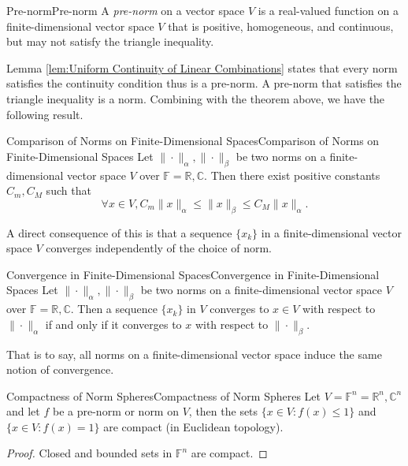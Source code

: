 \documentclass[../main.tex]{subfiles}
\begin{document}
\begin{definition}{Pre-norm}{Pre-norm}
  A \textit{pre-norm} on a vector space $V$ is a real-valued function on a finite-dimensional vector space $V$ that is positive, homogeneous, and continuous, but may not satisfy the triangle inequality.
\end{definition}

Lemma \ref{lem:Uniform Continuity of Linear Combinations} states that every norm satisfies the continuity condition thus is a pre-norm. A pre-norm that satisfies the triangle inequality is a norm. Combining with the theorem above, we have the following result.

\begin{corollary}{Comparison of Norms on Finite-Dimensional Spaces}{Comparison of Norms on Finite-Dimensional Spaces}
  Let $\|\cdot\|_\alpha, \|\cdot\|_\beta$ be two norms on a finite-dimensional vector space $V$ over $\mathbb{F} = \mathbb{R}, \mathbb{C}$. Then there exist positive constants $C_m, C_M$ such that
  \begin{equation*}
    \forall x \in V, C_m \|x\|_\alpha \leq \|x\|_\beta \leq C_M \|x\|_\alpha.
  \end{equation*}
\end{corollary}

A direct consequence of this is that a sequence $\{x_k\}$ in a finite-dimensional vector space $V$ converges independently of the choice of norm.

\begin{corollary}{Convergence in Finite-Dimensional Spaces}{Convergence in Finite-Dimensional Spaces}
  Let $\|\cdot\|_\alpha, \|\cdot\|_\beta$ be two norms on a finite-dimensional vector space $V$ over $\mathbb{F} = \mathbb{R}, \mathbb{C}$. Then a sequence $\{x_k\}$ in $V$ converges to $x \in V$ with respect to $\|\cdot\|_\alpha$ if and only if it converges to $x$ with respect to $\|\cdot\|_\beta$.

  That is to say, all norms on a finite-dimensional vector space induce the same notion of convergence.
\end{corollary}

\begin{corollary}{Compactness of Norm Spheres}{Compactness of Norm Spheres}
  Let $V = \mathbb{F}^n = \mathbb{R}^n, \mathbb{C}^n$ and let $f$ be a pre-norm or norm on $V$, then the sets $\{x \in V: f(x) \leq 1\}$ and $\{x \in V: f(x) = 1\}$ are compact (in Euclidean topology).
\end{corollary}
\begin{proof}
  Closed and bounded sets in $\mathbb{F}^n$ are compact.
\end{proof}
\end{document}
